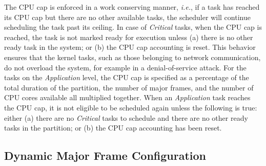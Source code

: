 \fi

The CPU cap is enforced in a work conserving manner, \textit{i.e.}, 
if a task has reached its CPU cap but there are no other
available tasks, the scheduler will continue scheduling the task past
its ceiling. In case of \emph{Critical} tasks, when the CPU cap is reached,
the task is not marked ready for execution unless
(a) there is no other ready task in the system; or 
(b) the CPU cap accounting is reset.
This behavior ensures that the kernel tasks, such as those belonging
to network communication, do not
overload the system, for example in a denial-of-service attack.
For the tasks on the \emph{Application} level, the CPU cap is
specified as a percentage of the total duration of the partition,
the number of major frames, and the number of CPU cores
available all multiplied together. When an \emph{Application} task reaches
the CPU cap, it is not eligible to be scheduled again unless 
the following is true: either
(a) there are no \emph{Critical} tasks to schedule and there are no other ready tasks in the partition; or (b) the CPU cap accounting has been reset.

\subsection{Dynamic Major Frame Configuration}
\label{sec:reconfiguration}

